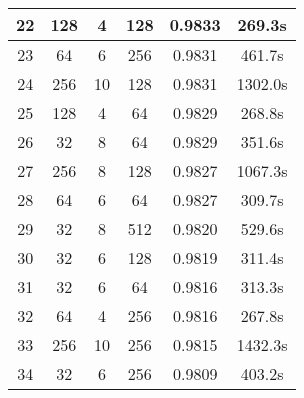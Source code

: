 \begin{table}[htbp]
\begin{center}
\begin{tabular}{|c|c|c|c|c|c|}
      \hline
      22            & 128                   & 4                       & 128                        & 0.9833                     & 269.3s                      \\
      \hline
      23            & 64                    & 6                       & 256                        & 0.9831                     & 461.7s                      \\
      \hline
      24            & 256                   & 10                      & 128                        & 0.9831                     & 1302.0s                     \\
      \hline
      25            & 128                   & 4                       & 64                         & 0.9829                     & 268.8s                      \\
      \hline
      26            & 32                    & 8                       & 64                         & 0.9829                     & 351.6s                      \\
      \hline
      27            & 256                   & 8                       & 128                        & 0.9827                     & 1067.3s                     \\
      \hline
      28            & 64                    & 6                       & 64                         & 0.9827                     & 309.7s                      \\
      \hline
      29            & 32                    & 8                       & 512                        & 0.9820                     & 529.6s                      \\
      \hline
      30            & 32                    & 6                       & 128                        & 0.9819                     & 311.4s                      \\
      \hline
      31            & 32                    & 6                       & 64                         & 0.9816                     & 313.3s                      \\
      \hline
      32            & 64                    & 4                       & 256                        & 0.9816                     & 267.8s                      \\
      \hline
      33            & 256                   & 10                      & 256                        & 0.9815                     & 1432.3s                     \\
      \hline
      34            & 32                    & 6                       & 256                        & 0.9809                     & 403.2s                      \\

\end{tabular}
\end{center}
\end{table}
